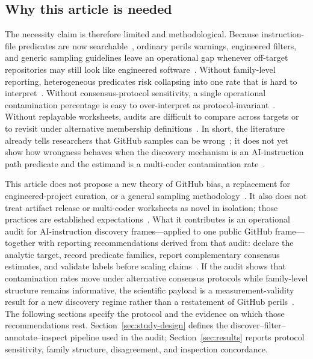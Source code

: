 \subsection{Why this article is needed}
\label{subsec:rw-why-needed}

The necessity claim is therefore limited and methodological.
Because instruction-file predicates are now searchable~\cite{agentsmd2025,cursor2024docs,brown2024copilot,claude2024docs,anthropic2024mcp,chen2025promptware}, ordinary perils warnings, engineered filters, and generic sampling guidelines leave an operational gap whenever off-target repositories may still look like engineered software~\cite{kalliamvakou2015indepth,munaiah2017curating,phantom2020,baltes2022sampling}.
Without family-level reporting, heterogeneous predicates risk collapsing into one rate that is hard to interpret~\cite{dabic2021sampling,baltes2022sampling}.
Without consensus-protocol sensitivity, a single operational contamination percentage is easy to over-interpret as protocol-invariant~\cite{tantithamthavorn2017validation,verdecchia2023threats}.
Without replayable worksheets, audits are difficult to compare across targets or to revisit under alternative membership definitions~\cite{heumuller2020,gonzalez2023revisit,winter2022artifacts}.
In short, the literature already tells researchers that GitHub samples can be wrong~\cite{kalliamvakou2015indepth}; it does not yet show how wrongness behaves when the discovery mechanism is an AI-instruction path predicate and the estimand is a multi-coder contamination rate~\cite{baltes2022sampling,tantithamthavorn2017validation,chen2025promptware}.

This article does not propose a new theory of GitHub bias, a replacement for engineered-project curation, or a general sampling methodology~\cite{kalliamvakou2015indepth,munaiah2017curating,baltes2022sampling}.
It also does not treat artifact release or multi-coder worksheets as novel in isolation; those practices are established expectations~\cite{heumuller2020,cohen1960kappa,runeson2009}.
What it contributes is an operational audit for AI-instruction discovery frames---applied to one public GitHub frame---together with reporting recommendations derived from that audit: declare the analytic target, record predicate families, report complementary consensus estimates, and validate labels before scaling claims~\cite{baltes2022sampling,verdecchia2023threats}.
If the audit shows that contamination rates move under alternative consensus protocols while family-level structure remains informative, the scientific payload is a measurement-validity result for a new discovery regime rather than a restatement of GitHub perils~\cite{tantithamthavorn2017validation,kalliamvakou2015indepth,baltes2022sampling}.
The following sections specify the protocol and the evidence on which those recommendations rest.
Section~\ref{sec:study-design} defines the discover--filter--annotate--inspect pipeline used in the audit; Section~\ref{sec:results} reports protocol sensitivity, family structure, disagreement, and inspection concordance.
